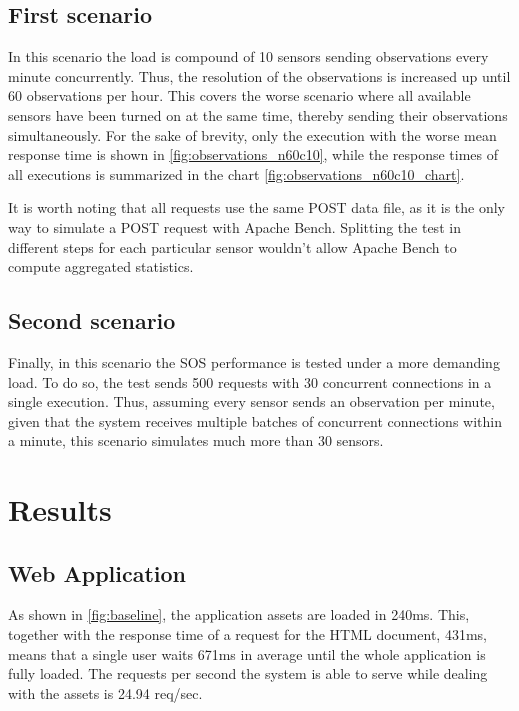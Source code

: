 \subsection*{First scenario}

In this scenario the load is compound of 10 sensors sending observations every minute concurrently. Thus, the resolution of the observations is increased up until 60 observations per hour. This covers the worse scenario where all available sensors have been turned on at the same time, thereby sending their observations simultaneously. For the sake of brevity, only the execution with the worse mean response time is shown in \ref{fig:observations_n60c10}, while the response times of all executions is summarized in the chart \ref{fig:observations_n60c10_chart}.

It is worth noting that all requests use the same POST data file, as it is the only way to simulate a POST request with Apache Bench. Splitting the test in different steps for each particular sensor wouldn't allow Apache Bench to compute aggregated statistics.

\subsection*{Second scenario}

Finally, in this scenario the SOS performance is tested under a more demanding load. To do so, the test sends 500 requests with 30 concurrent connections in a single execution. Thus, assuming every sensor sends an observation per minute, given that the system receives multiple batches of concurrent connections within a minute, this scenario simulates much more than 30 sensors.

\section{Results}

\subsection*{Web Application}

As shown in \ref{fig:baseline}, the application assets are loaded in 240ms. This, together with the response time of a request for the HTML document, 431ms, means that a single user waits 671ms in average until the whole application is fully loaded. The requests per second the system is able to serve while dealing with the assets is 24.94 req/sec.

